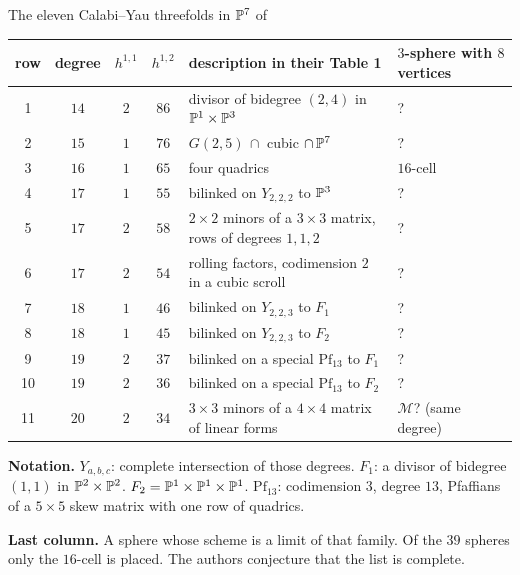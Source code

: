 \begin{frame}{The eleven Calabi--Yau threefolds in \(\mathbb P^7\) of \cite{CGKK}}
{\centering\footnotesize
\renewcommand{\arraystretch}{0.9}\setlength{\tabcolsep}{4pt}
\begin{tabular}{ccccll}
row & degree & \(h^{1,1}\) & \(h^{1,2}\) & description in their Table 1 & \(3\)-sphere with \(8\) vertices\\ \hline
1 & \(14\) & \(2\) & \(86\) & divisor of bidegree \((2,4)\) in \(\mathbb P^1\times\mathbb P^3\) & ?\\
2 & \(15\) & \(1\) & \(76\) & \(G(2,5)\,\cap\) cubic \(\cap\,\mathbb P^7\) & ?\\
3 & \(16\) & \(1\) & \(65\) & four quadrics & \(16\)-cell\\
4 & \(17\) & \(1\) & \(55\) & bilinked on \(Y_{2,2,2}\) to \(\mathbb P^3\) & ?\\
5 & \(17\) & \(2\) & \(58\) & \(2\times2\) minors of a \(3\times3\) matrix, rows of degrees \(1,1,2\) & ?\\
6 & \(17\) & \(2\) & \(54\) & rolling factors, codimension \(2\) in a cubic scroll & ?\\
7 & \(18\) & \(1\) & \(46\) & bilinked on \(Y_{2,2,3}\) to \(F_1\) & ?\\
8 & \(18\) & \(1\) & \(45\) & bilinked on \(Y_{2,2,3}\) to \(F_2\) & ?\\
9 & \(19\) & \(2\) & \(37\) & bilinked on a special \(\mathrm{Pf}_{13}\) to \(F_1\) & ?\\
10 & \(19\) & \(2\) & \(36\) & bilinked on a special \(\mathrm{Pf}_{13}\) to \(F_2\) & ?\\
11 & \(20\) & \(2\) & \(34\) & \(3\times3\) minors of a \(4\times4\) matrix of linear forms & \(\mathcal M\)? (same degree)
\end{tabular}\par}
{\footnotesize\textbf{Notation.} \(Y_{a,b,c}\): complete intersection of those degrees. \(F_1\): a divisor of bidegree \((1,1)\) in \(\mathbb P^2\times\mathbb P^2\). \(F_2=\mathbb P^1\times\mathbb P^1\times\mathbb P^1\). \(\mathrm{Pf}_{13}\): codimension \(3\), degree \(13\), Pfaffians of a \(5\times5\) skew matrix with one row of quadrics.
\par
\textbf{Last column.} A sphere whose scheme is a limit of that family. Of the \(39\) spheres only the \(16\)-cell is placed. The authors conjecture that the list is complete.\par}
\end{frame}

